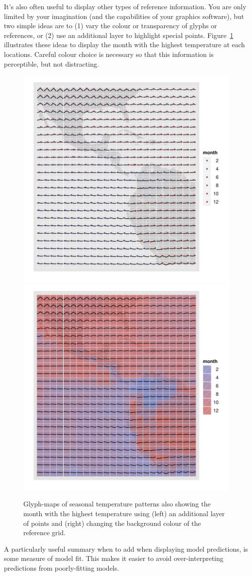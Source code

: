 \documentclass[oneside]{article}
\begin{document}
It's also often useful to display other types of reference information. You are only limited by your imagination (and the capabilities of your graphics software), but two simple ideas are to (1) vary the colour or transparency of glyphs or references, or (2) use an additional layer to highlight special points. Figure~\ref{fig:ref-adv} illustrates these ideas to display the month with the highest temperature at each locations. Careful colour choice is necessary so that this information is perceptible, but not distracting.

\begin{figure}[htbp]
  \centering
  \includegraphics[width=0.5\linewidth]{ref-max-1}%
  \includegraphics[width=0.5\linewidth]{ref-max-2}
  \caption{Glyph-maps of seasonal temperature patterns also showing the month with the highest temperature using (left) an additional layer of points and (right) changing the background colour of the reference grid.}
  \label{fig:ref-adv}
\end{figure}

A particularly useful summary when to add when displaying model predictions, is some measure of model fit. This makes it easier to avoid over-interpreting predictions from poorly-fitting models.
\end{document}
